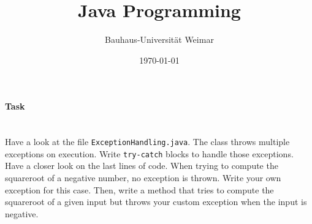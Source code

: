 \documentclass[10pt, a4paper]{article}
\newcounter{task}
\newcommand{\task}{\stepcounter{task}\paragraph{Task \thetask}\ \\}
\theoremstyle{definition}
\theoremstyle{remark}
\begin{document}
\pagestyle{plain}
\setlength{\parindent}{0pt}


\title{Java Programming
}
\author{
  \normalsize Bauhaus-Universit\"at Weimar\\
}
\date{\today}
\maketitle


\task
Have a look at the file \texttt{ExceptionHandling.java}. The class throws multiple exceptions on execution.
Write \texttt{try-catch} blocks to handle those exceptions. \\
Have a closer look on the last lines of code. When trying to compute the squareroot of a negative number,
no exception is thrown. Write your own exception for this case. Then, write a method that tries to compute
the squareroot of a given input but throws your custom exception when the input is negative.
\end{document}
